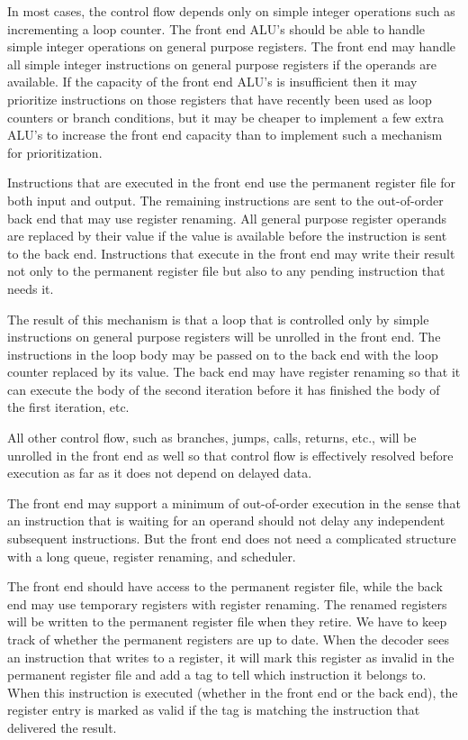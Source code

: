\documentclass[forwardcom.tex]{subfiles}
\begin{document}
In most cases, the control flow depends only on simple integer operations such as incrementing a loop counter. The front end ALU's should be able to handle simple integer operations on general purpose registers. The front end may handle all simple integer instructions on general purpose registers if the operands are available. If the capacity of the front end ALU's is insufficient then it may prioritize instructions on those registers that have recently been used as loop counters or branch conditions, but it may be cheaper to implement a few extra ALU's to increase the front end capacity than to implement such a mechanism for prioritization.
\vspace{2mm}

Instructions that are executed in the front end use the permanent register file for both input and output.  
The remaining instructions are sent to the out-of-order back end that may use register renaming. 
All general purpose register operands are replaced by their value if the value is available before the instruction is sent to the back end.
Instructions that execute in the front end may write their result not only to the permanent register file but also to any pending instruction that needs it.
\vspace{2mm}

The result of this mechanism is that a loop that is controlled only by simple instructions on general purpose registers
will be unrolled in the front end. The instructions in the loop body may be passed on to the back end with the loop counter replaced by its value. The back end may have register renaming so that it can execute the body of the second iteration before it has finished the body of the first iteration, etc.
\vspace{2mm}

All other control flow, such as branches, jumps, calls, returns, etc., will be unrolled in the front end as well so that control flow is effectively resolved before execution as far as it does not depend on delayed data.
\vspace{2mm}

The front end may support a minimum of out-of-order execution in the sense that an instruction that is waiting for an operand should not delay any independent subsequent instructions. But the front end does not need a complicated structure with a long queue, register renaming, and scheduler.
\vspace{2mm}

The front end should have access to the permanent register file, while the back end may use temporary registers with register renaming. The renamed registers will be written to the permanent register file when they retire. We have to keep track of whether the permanent registers are up to date. When the decoder sees an instruction that writes to a register, it will mark this register as invalid in the permanent register file and add a tag to tell which instruction it belongs to. When this instruction is executed (whether in the front end or the back end), the register entry is marked as valid if the tag is matching the instruction that delivered the result.
\vspace{2mm}
\end{document}
